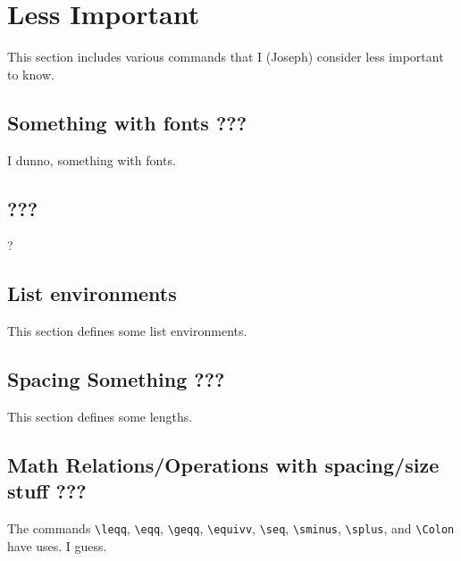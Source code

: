 \documentclass[11pt,twoside]{report}
\begin{document}
\section{Less Important}\label{sec-less-important}
This section includes various commands that I (Joseph) consider less important to know.

\subsection{Something with fonts ???}
I dunno, something with fonts.

\subsection{???}
?

\subsection{List environments}
This section defines some list environments.

\subsection{Spacing Something ???}
This section defines some lengths.

\subsection{Math Relations/Operations with spacing/size stuff ???}
The commands \lstinline$\leqq$, \lstinline$\eqq$, \lstinline$\geqq$, \lstinline$\equivv$, \lstinline$\seq$, \lstinline$\sminus$, \lstinline$\splus$, and \lstinline$\Colon$ have uses. I guess.
\end{document}
